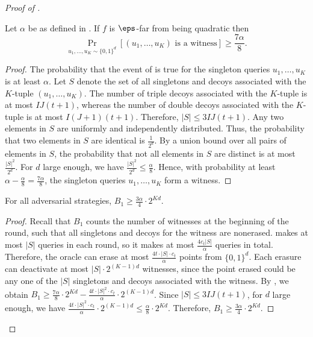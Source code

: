 \documentclass{toc}
\begin{document}
\begin{proof}[Proof of ]
\begin{claim} \label{clm:quadratic_witness}
Let $\alpha$ be as defined in .
If $f$ is $\eps$-far from being quadratic then
\begin{equation*}
    \Pr_{u_1, \dots,u_{K} \sim \{0,1\}^d }[(u_1,\dots,u_{K}) \text{ is a witness}] \geq \frac{7\alpha}{8}. 
\end{equation*}
\end{claim}
\begin{proof}
    The probability that the event of  is true for the singleton queries $u_1, \dots, u_{K}$ is at least $\alpha$.  Let $S$ denote the set of all singletons and decoys associated with the $K$-tuple $(u_1, \dots, u_{K})$. The number of triple decoys associated with the $K$-tuple is at most $IJ(t+1)$, whereas the number of double decoys associated with the $K$-tuple is at most $I(J+1)(t+1)$. Therefore, $|S| \leq 3IJ(t+1)$. Any two elements in $S$ are uniformly and independently distributed. Thus, the probability that two elements in $S$ are identical is $\frac{1}{2^d}$. By a union bound over all pairs of elements in $S$, the probability that not all elements in $S$ are distinct is at most $\frac{|S|^2}{2^d}$. For $d$ large enough, we have $\frac{|S|^2}{2^d} \leq \frac{\alpha}{8}$. Hence, with probability at least $\alpha - \frac{\alpha}{8} = \frac{7\alpha}{8}$, the singleton queries $u_1, \dots, u_{K}$ form a witness. 
\end{proof}


\begin{claim} For all adversarial strategies, $B_1 \geq \frac{3\alpha}{4} \cdot 2^{Kd}$.  \label{clm:b1}
\end{claim}
\begin{proof}
    Recall that $B_1$ counts the number of witnesses at the beginning of the round, such that  all singletons and decoys for the witness are nonerased.  makes at most $|S|$ queries in each round, so it makes at most $\frac{4c_t|S|}{\alpha}$ queries in total. Therefore, the oracle can erase at most $\frac{4t\cdot |S| \cdot c_t}{\alpha}$ points from $\{0,1\}^d$. Each erasure can deactivate at most $|S| \cdot 2^{(K-1)d}$ witnesses, since the point erased could be any one of the $|S|$ singletons and decoys associated with the witness. By , we obtain $B_1 \geq \frac{7\alpha}{8} \cdot 2^{Kd} - \frac{4t \cdot |S|^2\cdot c_t}{\alpha} \cdot 2^{(K-1)d}$. Since $|S| \leq 3IJ(t+1)$, for $d$ large enough, we have $\frac{4t \cdot |S|^2 \cdot c_t}{\alpha} \cdot 2^{(K-1)d} \leq \frac{\alpha}{8} \cdot 2^{Kd}$. Therefore, $B_1 \geq \frac{3\alpha}{4}\cdot 2^{Kd}$. 
\end{proof}



\end{proof}
\end{document}
